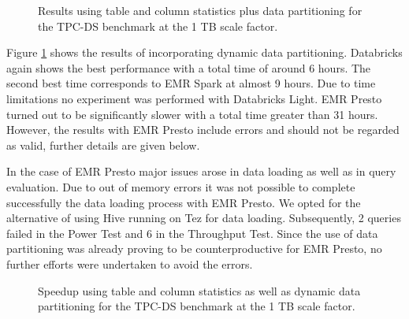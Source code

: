 \begin{figure}
   \begin{center}
   \end{center}
   \caption{Results using table and column statistics plus data partitioning for the TPC-DS benchmark at the 1 TB scale factor.}
   \label{fig:partstatsResults}
\end{figure}

Figure \ref{fig:partstatsResults} shows the results of incorporating dynamic data partitioning. Databricks again shows the best performance with a total time of around 6 hours. The second best time corresponds to EMR Spark at almost 9 hours. Due to time limitations no experiment was performed with Databricks Light. EMR Presto turned out to be significantly slower with a total time greater than 31 hours. However, the results with EMR Presto include errors and should not be regarded as valid, further details are given below.

In the case of EMR Presto major issues arose in data loading as well as in query evaluation. Due to out of memory errors it was not possible to complete successfully the data loading process with EMR Presto. We opted for the alternative of using Hive running on Tez for data loading. Subsequently, 2 queries failed in the Power Test and 6 in the Throughput Test. Since the use of data partitioning was already proving to be counterproductive for EMR Presto, no further efforts were undertaken to avoid the errors.

 \begin{figure}
   \begin{center}
   \end{center}
   \caption{Speedup using table and column statistics as well as dynamic data partitioning for the TPC-DS benchmark at the 1 TB scale factor.}
   \label{fig:partstatsSpeedup}
\end{figure}

